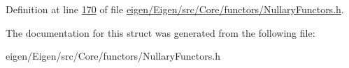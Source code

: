 Definition at line \hyperlink{eigen_2_eigen_2src_2_core_2functors_2_nullary_functors_8h_source_l00170}{170} of file \hyperlink{eigen_2_eigen_2src_2_core_2functors_2_nullary_functors_8h_source}{eigen/\+Eigen/src/\+Core/functors/\+Nullary\+Functors.\+h}.



The documentation for this struct was generated from the following file\+:\begin{DoxyCompactItemize}
\item 
eigen/\+Eigen/src/\+Core/functors/\+Nullary\+Functors.\+h\end{DoxyCompactItemize}
